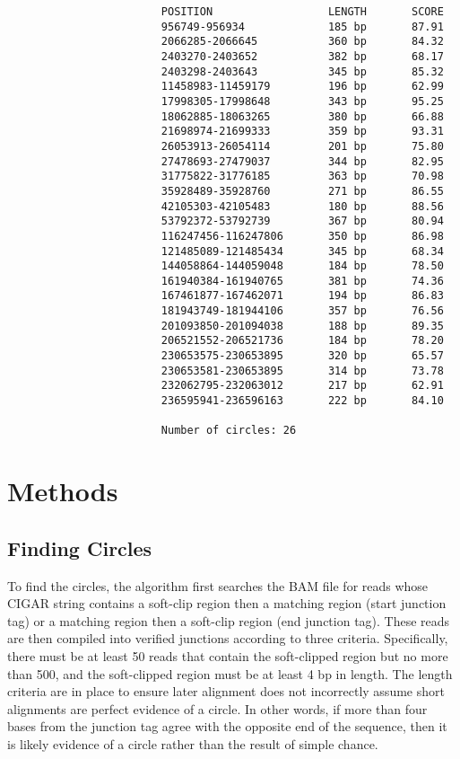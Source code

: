 \documentclass[11pt, letterpaper]{article}
\begin{document}
\begin{verbatim}
                        POSITION                  LENGTH       SCORE
                        956749-956934             185 bp       87.91
                        2066285-2066645           360 bp       84.32
                        2403270-2403652           382 bp       68.17
                        2403298-2403643           345 bp       85.32
                        11458983-11459179         196 bp       62.99
                        17998305-17998648         343 bp       95.25
                        18062885-18063265         380 bp       66.88
                        21698974-21699333         359 bp       93.31
                        26053913-26054114         201 bp       75.80
                        27478693-27479037         344 bp       82.95
                        31775822-31776185         363 bp       70.98
                        35928489-35928760         271 bp       86.55
                        42105303-42105483         180 bp       88.56
                        53792372-53792739         367 bp       80.94
                        116247456-116247806       350 bp       86.98
                        121485089-121485434       345 bp       68.34
                        144058864-144059048       184 bp       78.50
                        161940384-161940765       381 bp       74.36
                        167461877-167462071       194 bp       86.83
                        181943749-181944106       357 bp       76.56
                        201093850-201094038       188 bp       89.35
                        206521552-206521736       184 bp       78.20
                        230653575-230653895       320 bp       65.57
                        230653581-230653895       314 bp       73.78
                        232062795-232063012       217 bp       62.91
                        236595941-236596163       222 bp       84.10
                        
                        Number of circles: 26
\end{verbatim}


\section{Methods}

\subsection{Finding Circles}
To find the circles, the algorithm first searches the BAM file for reads whose CIGAR string contains a soft-clip region then a matching region (start junction tag) or a matching region then a soft-clip region (end junction tag). These reads are then compiled into verified junctions according to three criteria. Specifically, there must be at least 50 reads that contain the soft-clipped region but no more than 500, and the soft-clipped region must be at least 4 bp in length. The length criteria are in place to ensure later alignment does not incorrectly assume short alignments are perfect evidence of a circle. In other words, if more than four bases from the junction tag agree with the opposite end of the sequence, then it is likely evidence of a circle rather than the result of simple chance. 
\end{document}

